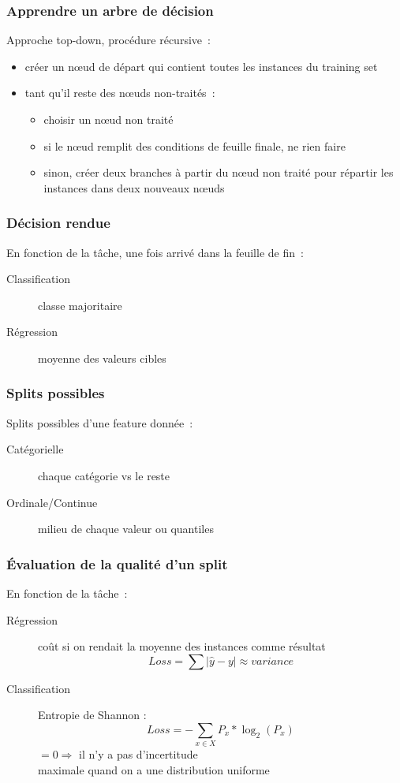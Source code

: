 \documentclass{formation}
\begin{document}
\begin{frame}
  \frametitle{Apprendre un arbre de décision}
  Approche \og top-down\fg, procédure récursive :
  \begin{itemize}[<+->]
  \item créer un nœud de départ qui contient toutes les instances du
    training set
  \item tant qu'il reste des nœuds non-traités :
    \begin{itemize}
    \item choisir un nœud non traité
    \item si le nœud remplit des conditions de feuille finale, ne rien
      faire
    \item sinon, créer deux branches à partir du nœud non traité
      pour répartir les instances dans deux nouveaux nœuds
    \end{itemize}
  \end{itemize}
\end{frame}

\begin{frame}
  \frametitle{Décision rendue}
  En fonction de la tâche, une fois arrivé dans la feuille de fin :
  \begin{description}
  \item[Classification] classe majoritaire
  \item[Régression] moyenne des valeurs cibles
  \end{description}
\end{frame}

\begin{frame}
  \frametitle{Splits possibles}
  Splits possibles d'une feature donnée :
  \begin{description}
  \item[Catégorielle] chaque catégorie vs le reste
  \item[Ordinale/Continue] milieu de chaque valeur ou
    quantiles
  \end{description}
\end{frame}

\begin{frame}
  \frametitle{Évaluation de la qualité d'un split}
  En fonction de la tâche :
  \begin{description}
  \item[Régression] coût si on rendait la moyenne des instances
    comme résultat
    \[
      Loss = \sum|\hat{y}-y| \approx variance
    \]
  \item[Classification] Entropie de Shannon :
    \[
    Loss = -\sum_{x \in X}P_x*\log_2(P_x)
    \]
    $= 0 \Rightarrow$ il n'y a pas d'incertitude \\
    maximale quand on a une distribution uniforme
  \end{description}
\end{frame}
\end{document}
